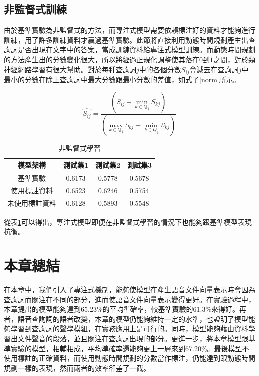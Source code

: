 \subsection{非監督式訓練}

由於基準實驗為非監督式的方法，而專注式模型需要依賴標注好的資料才能夠進行訓練，用了許多訓練資料才贏過基準實驗。此節將直接利用動態時間規劃產生出查詢詞是否出現在文字中的答案，當成訓練資料給專注式模型訓練。而動態時間規劃的方法產生出的分數變化很大，所以將經過正規化調整使其落在$0$到$1$之間，對於類神經網路學習有很大幫助。對於每種查詢詞$j$中的各個分數$S_{ij}$會減去在查詢詞$j$中最小的分數在除上查詢詞中最大分數跟最小分數的差值，如式子\ref{norm}所示。

\begin{equation}
\label{norm}
\hat{S_{ij}} = \frac{(S_{ij}- \min_{k \in Q_j} S_{kj})} { (\max_{k \in
		Q_j} S_{kj} - \min_{k \in Q_j} S_{kj})}
\end{equation}
\begin{table}[ht]
	 \centering
	 \caption{非監督式學習}
	 \label{table:ch4_unsup}
	 \begin{tabular}{|c|c|c|c|c|}
		 \hline
		 \multicolumn{2}{|c|}{模型架構} & 測試集1 & 測試集2 & 測試集3 \\
		 \hline
		 \multicolumn{2}{|c|}{基準實驗} & 0.6173 & 0.5778 & 0.5678\\
		 \hline
		 \multicolumn{2}{|c|}{使用標註資料} &0.6523&0.6246 &0.5754 \\
		 \hline
		 \multicolumn{2}{|c|}{未使用標註資料} &0.6128&0.5893 &0.5548 \\
		 \hline
	   \end{tabular}
\end{table}

從表\ref{table:ch4_unsup}可以得出，專注式模型即便在非監督式學習的情況下也能夠跟基準模型表現抗衡。
\section{本章總結}
在本章中，我們引入了專注式機制，能夠使模型在產生語音文件向量表示時會因為查詢詞而關注在不同的部分，進而使語音文件向量表示變得更好。在實驗過程中，本章提出的模型能夠達到65.23\%的平均準確率，較基準實驗的61.3\%來得好。再者，語音查詢詞的語者改變，本章的模型仍能夠維持一定的水準，也證明了模型能夠學習到查詢詞的聲學模組，在實務應用上是可行的。同時，模型能夠藉由資料學習出文件聲音的段落，並且關注在查詢詞出現的部分。更進一步，將本章模型跟基準實驗的模型，相輔相成，平均準確率還能夠更上一層來到67.20\%。最後模型不使用標註的正確資料，而使用動態時間規劃的分數當作標注，仍能達到跟動態時間規劃一樣的表現，然而兩者的效率卻差了一截。
